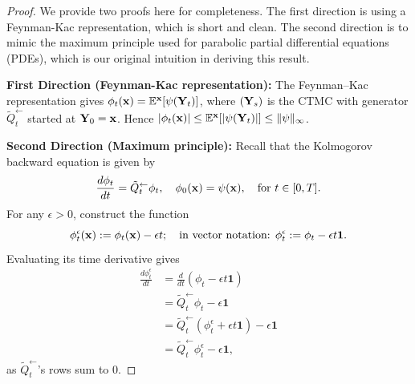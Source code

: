 \documentclass{article} %
\newcommand{\E}{\mathbb{E}}
\newcommand{\bfY}{{\bf Y}}
\newcommand{\bfx}{{\bf x}}
\begin{document}
\begin{proof}
We provide two proofs here for completeness. The first direction is using a Feynman-Kac representation, which is short and clean. The second direction is to mimic the maximum principle used for parabolic partial differential equations (PDEs), which is our original intuition in deriving this result.

\textbf{First Direction (Feynman-Kac representation):}
The Feynman--Kac representation gives $\phi_t(\bfx) = \E^\bfx[\psi(\bfY_t)]$, where $(\bfY_s)$ is the CTMC with generator $\tilde{Q}_{t}^{\leftarrow}$ started at $\bfY_0 = \bfx$. Hence $|\phi_t(\bfx)| \le \E^\bfx[|\psi(\bfY_t)|] \le \|\psi\|_\infty$.

\textbf{Second Direction (Maximum principle):} Recall that the Kolmogorov backward equation is given by
    \begin{equation*}
    \frac{d\phi_t}{dt}=\tilde{Q}_{t}^{\leftarrow} \phi_t, \quad \phi_0(\bfx)=\psi(\bfx), \quad \text{for } t \in [0, T].
    \end{equation*}
    For any $\epsilon >0$, construct the function
    \begin{equation*}
        \phi_t^\epsilon(\bfx) := \phi_t(\bfx) - \epsilon t; \quad \text{in vector notation: } \phi_t^\epsilon := \phi_t - \epsilon t\mathbf{1}.
    \end{equation*}
    Evaluating its time derivative gives
    \begin{align}
        \frac{d \phi_t^\epsilon }{dt} &= \frac{d}{dt}(\phi_t - \epsilon t \mathbf{1}) \nonumber \\
        &= \tilde{Q}_{t}^{\leftarrow} \phi_t - \epsilon \mathbf{1} \nonumber \\
        &= \tilde{Q}_{t}^{\leftarrow} \left( \phi^\epsilon_t + \epsilon t \mathbf{1} \right) - \epsilon \mathbf{1} \nonumber \\
        &= \tilde{Q}_{t}^{\leftarrow}  \phi^\epsilon_t  - \epsilon \mathbf{1} ,  \label{eq:d_phi_epsilon} \end{align}
        as $\tilde{Q}_{t}^{\leftarrow}$'s rows sum to 0.
        

\end{proof}
\end{document}
